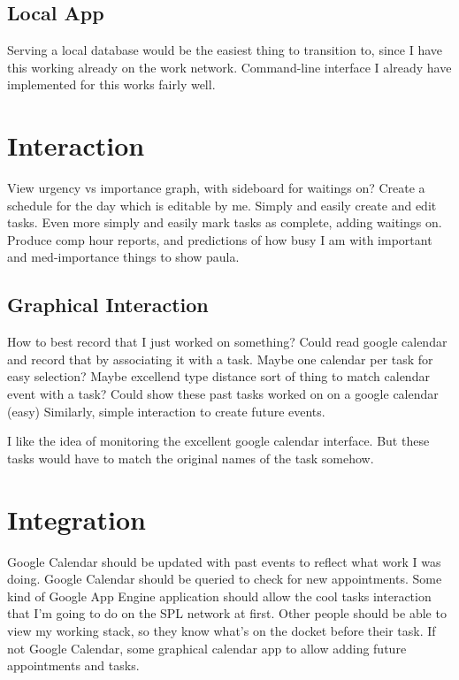 \documentclass[12pt]{article}
\begin{document}
\subsection{Local App}
Serving a local database would be the easiest thing to transition to, since I have this working
already on the work network.  Command-line interface I already have implemented for this
works fairly well.

\section{Interaction}
View urgency vs importance graph, with sideboard for waitings on?
Create a schedule for the day which is editable by me.
Simply and easily create and edit tasks.
Even more simply and easily mark tasks as complete, adding waitings on. 
Produce comp hour reports, and predictions of how busy I am with 
important and med-importance things to show paula.

\subsection{Graphical Interaction}
How to best record that I just worked on something?  
Could read google calendar and record that by associating it with a task.
Maybe one calendar per task for easy selection?  Maybe excellend type distance
sort of thing to match calendar event with a task?
Could show these past tasks worked on on a google calendar (easy)
Similarly, simple interaction to create future events.

I like the idea of monitoring the excellent google calendar interface.  But these tasks
would have to match the original names of the task somehow.

\section{Integration}
Google Calendar should be updated with past events to reflect what work I was doing.
Google Calendar should be queried to check for new appointments.
Some kind of Google App Engine application should allow the cool tasks interaction
that I'm going to do on the SPL network at first.
Other people should be able to view my working stack, so they know what's on the docket
before their task.
If not Google Calendar, some graphical calendar app to allow adding future appointments
and tasks.
\end{document}
